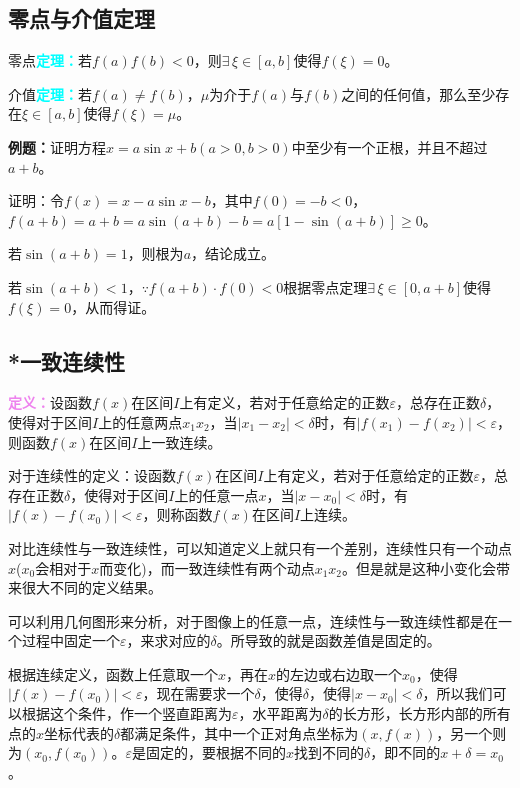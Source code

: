 \documentclass[UTF8, 12pt]{ctexart}
\begin{document}
\subsection{零点与介值定理}

零点\textcolor{aqua}{\textbf{定理：}}若$f(a)f(b)<0$，则$\exists\,\xi\in[a,b]$使得$f(\xi)=0$。

介值\textcolor{aqua}{\textbf{定理：}}若$f(a)\neq f(b)$，$\mu$为介于$f(a)$与$f(b)$之间的任何值，那么至少存在$\xi\in[a,b]$使得$f(\xi)=\mu$。

\textbf{例题：}证明方程$x=a\sin x+b(a>0,b>0)$中至少有一个正根，并且不超过$a+b$。

证明：令$f(x)=x-a\sin x-b$，其中$f(0)=-b<0$，$f(a+b)=a+b=a\sin(a+b)-b=a[1-\sin(a+b)]\geqslant 0$。

若$\sin(a+b)=1$，则根为$a$，结论成立。

若$\sin(a+b)<1$，$\because f(a+b)\cdot f(0)<0$根据零点定理$\exists\,\xi\in[0,a+b]$使得$f(\xi)=0$，从而得证。

\subsection{*一致连续性}

\textcolor{violet}{\textbf{定义：}}设函数$f(x)$在区间$I$上有定义，若对于任意给定的正数$\varepsilon$，总存在正数$\delta$，使得对于区间$I$上的任意两点$x_1x_2$，当$\vert x_1-x_2\vert<\delta$时，有$\vert f(x_1)-f(x_2)\vert<\varepsilon$，则函数$f(x)$在区间$I$上一致连续。

对于连续性的定义：设函数$f(x)$在区间$I$上有定义，若对于任意给定的正数$\varepsilon$，总存在正数$\delta$，使得对于区间$I$上的任意一点$x$，当$\vert x-x_0\vert<\delta$时，有$\vert f(x)-f(x_0)\vert<\varepsilon$，则称函数$f(x)$在区间$I$上连续。

对比连续性与一致连续性，可以知道定义上就只有一个差别，连续性只有一个动点$x$($x_0$会相对于$x$而变化)，而一致连续性有两个动点$x_1x_2$。但是就是这种小变化会带来很大不同的定义结果。

可以利用几何图形来分析，对于图像上的任意一点，连续性与一致连续性都是在一个过程中固定一个$\varepsilon$，来求对应的$\delta$。所导致的就是函数差值是固定的。

根据连续定义，函数上任意取一个$x$，再在$x$的左边或右边取一个$x_0$，使得$\vert f(x)-f(x_0)\vert<\varepsilon$，现在需要求一个$\delta$，使得$\delta$，使得$\vert x-x_0\vert<\delta$，所以我们可以根据这个条件，作一个竖直距离为$\varepsilon$，水平距离为$\delta$的长方形，长方形内部的所有点的$x$坐标代表的$\delta$都满足条件，其中一个正对角点坐标为$(x,f(x))$，另一个则为$(x_0,f(x_0))$。$\varepsilon$是固定的，要根据不同的$x$找到不同的$\delta$，即不同的$x+\delta=x_0$。
\end{document}
